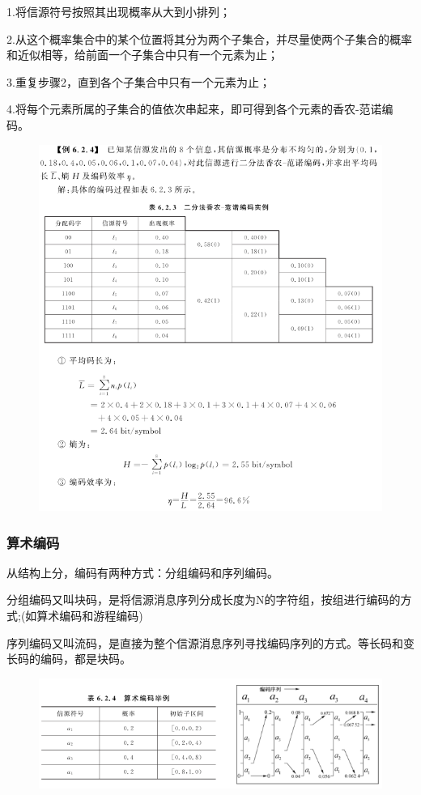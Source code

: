 \documentclass[11pt]{article}
\begin{document}
1.将信源符号按照其出现概率从大到小排列；

2.从这个概率集合中的某个位置将其分为两个子集合，并尽量使两个子集合的概率和近似相等，给前面一个子集合中只有一个元素为止；

3.重复步骤2，直到各个子集合中只有一个元素为止；

4.将每个元素所属的子集合的值依次串起来，即可得到各个元素的香农-范诺编码。

\begin{figure}[H]
	\centering
	\includegraphics[scale=0.6]{40}
\end{figure}

\subsubsection{算术编码}
从结构上分，编码有两种方式：分组编码和序列编码。

\noindent 分组编码又叫块码，是将信源消息序列分成长度为N的字符组，按组进行编码的方式;(如算术编码和游程编码)

\noindent 序列编码又叫流码，是直接为整个信源消息序列寻找编码序列的方式。等长码和变长码的编码，都是块码。

\begin{figure}[H]
	\centering
	\includegraphics[scale=0.6]{41}
\end{figure}
\end{document}
